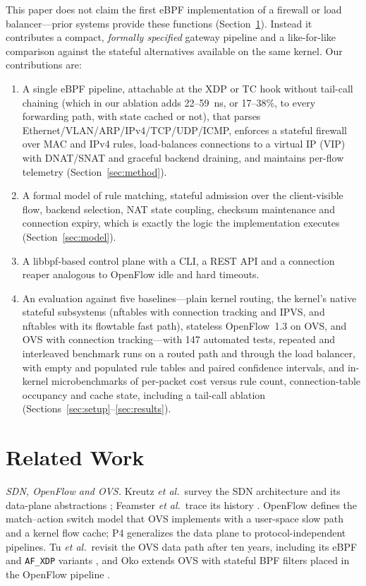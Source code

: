 \documentclass[conference]{IEEEtran}
\begin{document}
This paper does not claim the first eBPF implementation of a firewall or load
balancer---prior systems provide these functions (Section~\ref{sec:related}). Instead it
contributes a compact, \emph{formally specified} gateway pipeline and a
like-for-like comparison against the stateful alternatives available on the
same kernel. Our contributions are:
\begin{enumerate}
\item A single eBPF pipeline, attachable at the XDP or TC hook without
tail-call chaining (which in our ablation adds 22--59~ns, or 17--38\%, to
every forwarding path, with state cached or not), that parses Ethernet/VLAN/ARP/IPv4/TCP/UDP/ICMP, enforces
a stateful firewall over MAC and IPv4 rules, load-balances connections to a
virtual IP (VIP) with DNAT/SNAT and graceful backend draining, and maintains
per-flow telemetry (Section~\ref{sec:method}).
\item A formal model of rule matching, stateful admission over the
client-visible flow, backend selection, NAT state coupling, checksum
maintenance and connection expiry, which is exactly the logic the
implementation executes (Section~\ref{sec:model}).
\item A libbpf-based control plane with a CLI, a REST API and a connection
reaper analogous to OpenFlow idle and hard timeouts.
\item An evaluation against five baselines---plain kernel routing, the
kernel's native stateful subsystems (nftables with connection tracking and
IPVS, and nftables with its flowtable fast path), stateless OpenFlow~1.3 on
OVS, and OVS with connection tracking---with 147 automated tests, repeated
and interleaved benchmark runs on a routed path and through the load
balancer, with empty and populated rule tables and paired confidence
intervals, and in-kernel
microbenchmarks of per-packet cost versus rule count, connection-table
occupancy and cache state, including a tail-call ablation (Sections~\ref{sec:setup}--\ref{sec:results}).
\end{enumerate}

\section{Related Work}
\label{sec:related}
\textit{SDN, OpenFlow and OVS.} Kreutz \textit{et al.}\ survey the SDN
architecture and its data-plane abstractions \cite{kreutz2015sdn}; Feamster
\textit{et al.}\ trace its history \cite{feamster2014road}. OpenFlow
\cite{mckeown2008openflow} defines the match--action switch model that OVS
\cite{pfaff2015ovs} implements with a user-space slow path and a kernel flow
cache; P4 \cite{bosshart2014p4} generalizes the data plane to
protocol-independent pipelines. Tu \textit{et al.}\ revisit the OVS data path
after ten years, including its eBPF and \texttt{AF\_XDP} variants \cite{tu2021ovs}, and
Oko extends OVS with stateful BPF filters placed in the OpenFlow pipeline
\cite{chaignon2018oko}.
\end{document}
